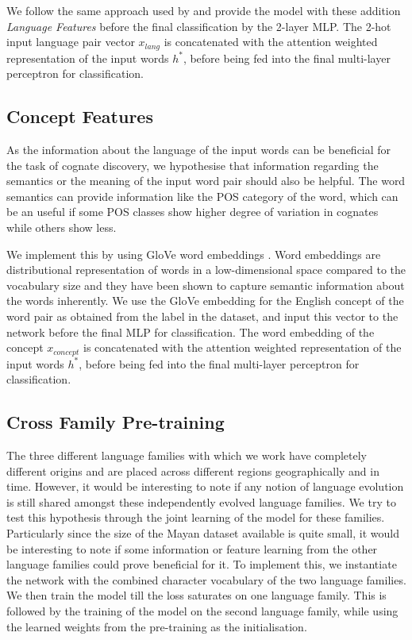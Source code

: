 \documentclass[11pt,letterpaper]{article}
\begin{document}
We follow the same approach used by \cite{rama2016siamese} and provide the model with these addition \textit{Language Features} before the final classification by the 2-layer MLP. The 2-hot input language pair vector $x_{lang}$ is concatenated with the attention weighted representation of the input words $h^{*}$, before being fed into the final multi-layer perceptron for classification.

\subsection{Concept Features}

As the information about the language of the input words can be beneficial for the task of cognate discovery, we hypothesise that information regarding the semantics or the meaning of the input word pair should also be helpful. The word semantics can provide information like the POS category of the word, which can be an useful if some POS classes show higher degree of variation in cognates while others show less.

We implement this by using GloVe word embeddings \cite{pennington2014glove}. Word embeddings are distributional representation of words in a low-dimensional space compared to the vocabulary size and they have been shown to capture semantic information about the words inherently. We use the GloVe embedding for the English concept of the word pair as obtained from the label in the dataset, and input this vector to the network before the final MLP for classification. The word embedding of the concept $x_{concept}$ is concatenated with the attention weighted representation of the input words $h^{*}$, before being fed into the final multi-layer perceptron for classification.

\subsection{Cross Family Pre-training}

The three different language families with which we work have completely different origins and are placed across different regions geographically and in time. However, it would be interesting to note if any notion of language evolution is still shared amongst these independently evolved language families. We try to test this hypothesis through the joint learning of the model for these families. Particularly since the size of the Mayan dataset available is quite small, it would be interesting to note if some information or feature learning from the other language families could prove beneficial for it. To implement this, we instantiate the network with the combined character vocabulary of the two language families. We then train the model till the loss saturates on one language family. This is followed by the training of the model on the second language family, while using the learned weights from the pre-training as the initialisation. 
\end{document}
